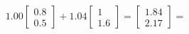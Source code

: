 \documentclass[preview]{standalone}
\begin{document}
\begin{align*}
1.00 \begin{bmatrix} 0.8 \\ 0.5 \end{bmatrix} + 1.04 \begin{bmatrix} 1 \\ 1.6 \end{bmatrix} = \begin{bmatrix} 1.84 \\ 2.17 \end{bmatrix} =
\end{align*}
\end{document}
